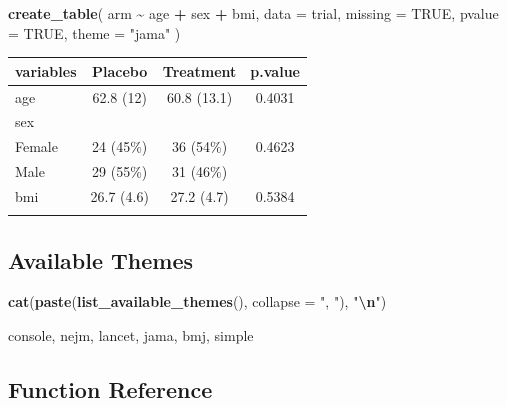 \documentclass[
]{article}
\newenvironment{Shaded}{\begin{snugshade}}{\end{snugshade}}
\newcommand{\AttributeTok}[1]{\textcolor[rgb]{0.13,0.29,0.53}{#1}}
\newcommand{\ConstantTok}[1]{\textcolor[rgb]{0.56,0.35,0.01}{#1}}
\newcommand{\FunctionTok}[1]{\textcolor[rgb]{0.13,0.29,0.53}{\textbf{#1}}}
\newcommand{\NormalTok}[1]{#1}
\newcommand{\SpecialCharTok}[1]{\textcolor[rgb]{0.81,0.36,0.00}{\textbf{#1}}}
\newcommand{\StringTok}[1]{\textcolor[rgb]{0.31,0.60,0.02}{#1}}
\begin{document}
\begin{Shaded}
\begin{Highlighting}[]
\FunctionTok{create\_table}\NormalTok{(}
\NormalTok{  arm }\SpecialCharTok{\textasciitilde{}}\NormalTok{ age }\SpecialCharTok{+}\NormalTok{ sex }\SpecialCharTok{+}\NormalTok{ bmi,}
  \AttributeTok{data =}\NormalTok{ trial,}
  \AttributeTok{missing =} \ConstantTok{TRUE}\NormalTok{,}
  \AttributeTok{pvalue =} \ConstantTok{TRUE}\NormalTok{,}
  \AttributeTok{theme =} \StringTok{"jama"}
\NormalTok{)}
\end{Highlighting}
\end{Shaded}

\begin{tabular}{lccc}
\toprule

\textbf{variables} & \textbf{Placebo} & \textbf{Treatment} & \textbf{p.value} \\
\midrule
age & 62.8 (12) & 60.8 (13.1) & 0.4031 \\
sex &  &  &  \\
\hspace{1em}Female & 24 (45\%) & 36 (54\%) & 0.4623 \\
\hspace{1em}Male & 29 (55\%) & 31 (46\%) &  \\
bmi & 26.7 (4.6) & 27.2 (4.7) & 0.5384 \\
 &  &  &  \\
\bottomrule
\end{tabular}

\subsection{Available Themes}\label{available-themes}

\begin{Shaded}
\begin{Highlighting}[]
\FunctionTok{cat}\NormalTok{(}\FunctionTok{paste}\NormalTok{(}\FunctionTok{list\_available\_themes}\NormalTok{(), }\AttributeTok{collapse =} \StringTok{", "}\NormalTok{), }\StringTok{"}\SpecialCharTok{\textbackslash{}n}\StringTok{"}\NormalTok{)}
\end{Highlighting}
\end{Shaded}

console, nejm, lancet, jama, bmj, simple

\subsection{Function Reference}\label{function-reference}
\end{document}
